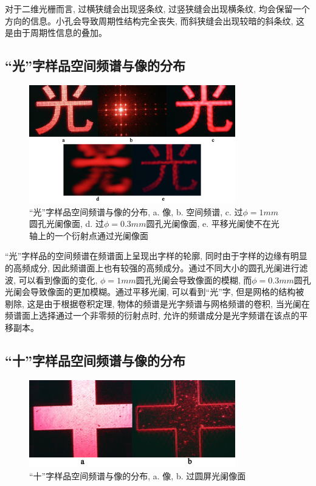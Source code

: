 \documentclass[12pt]{article}
\numberwithin{equation}{section}
\numberwithin{figure}{section}
\begin{document}
对于二维光栅而言, 过横狭缝会出现竖条纹, 过竖狭缝会出现横条纹, 均会保留一个方向的信息。小孔会导致周期性结构完全丧失, 而斜狭缝会出现较暗的斜条纹, 这是由于周期性信息的叠加。

\subsection{“光”字样品空间频谱与像的分布}

\begin{figure}[ht!]
    \centering
    \includegraphics[width=0.8\textwidth]{photos/light.png}
    \caption{\centering “光”字样品空间频谱与像的分布, a. 像, b. 空间频谱, c. 过$\phi=1mm$圆孔光阑像面, d. 过$\phi=0.3mm$圆孔光阑像面, e. 平移光阑使不在光轴上的一个衍射点通过光阑像面}
    \label{fig:experiment5}
\end{figure}

“光”字样品的空间频谱在频谱面上呈现出字样的轮廓, 同时由于字样的边缘有明显的高频成分, 因此频谱面上也有较强的高频成分。通过不同大小的圆孔光阑进行滤波, 可以看到像面的变化, $\phi=1mm$圆孔光阑会导致像面的模糊, 而$\phi=0.3mm$圆孔光阑会导致像面的更加模糊。通过平移光阑, 可以看到“光”字, 但是网格的结构被剔除, 这是由于根据卷积定理, 物体的频谱是光字频谱与网格频谱的卷积, 当光阑在频谱面上选择通过一个非零频的衍射点时, 允许的频谱成分是光字频谱在该点的平移副本。

\subsection{“十”字样品空间频谱与像的分布}

\begin{figure}[h!]
    \centering
    \includegraphics[width=0.8\textwidth]{photos/ten.png}
    \caption{\centering “十”字样品空间频谱与像的分布, a. 像, b. 过圆屏光阑像面}
    \label{fig:experiment6}
\end{figure}
\end{document}
